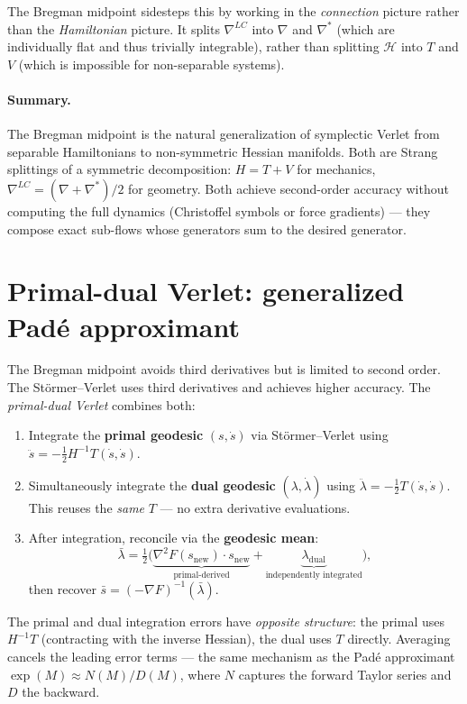 \documentclass[11pt]{article}
\begin{document}
The Bregman midpoint sidesteps this by working in the \emph{connection}
picture rather than the \emph{Hamiltonian} picture.  It splits
$\nabla^{LC}$ into $\nabla$ and $\nabla^*$ (which are individually flat
and thus trivially integrable), rather than splitting $\mathcal{H}$ into
$T$ and $V$ (which is impossible for non-separable systems).

\paragraph{Summary.}
The Bregman midpoint is the natural generalization of symplectic
Verlet from separable Hamiltonians to non-symmetric Hessian manifolds.
Both are Strang splittings of a symmetric decomposition:
$H = T + V$ for mechanics, $\nabla^{LC} = (\nabla + \nabla^*)/2$ for
geometry.  Both achieve second-order accuracy without computing the
full dynamics (Christoffel symbols or force gradients) --- they compose
exact sub-flows whose generators sum to the desired generator.

\section{Primal-dual Verlet: generalized Pad\'e approximant}
\label{sec:pd-verlet}

The Bregman midpoint avoids third derivatives but is limited to second
order.  The St\"ormer--Verlet uses third derivatives and achieves higher
accuracy.  The \emph{primal-dual Verlet} combines both:

\begin{enumerate}
  \item Integrate the \textbf{primal geodesic} $(s, \dot{s})$ via
    St\"ormer--Verlet using $\ddot{s} = -\frac{1}{2} H^{-1} T(\dot{s}, \dot{s})$.
  \item Simultaneously integrate the \textbf{dual geodesic} $(\lambda, \dot{\lambda})$
    using $\ddot{\lambda} = -\frac{1}{2} T(\dot{s}, \dot{s})$.
    This reuses the \emph{same} $T$ --- no extra derivative evaluations.
  \item After integration, reconcile via the \textbf{geodesic mean}:
    \[
      \bar{\lambda} = \tfrac{1}{2}\bigl(\underbrace{\nabla^2 F(s_{\text{new}}) \cdot s_{\text{new}}}_{\text{primal-derived}} + \underbrace{\lambda_{\text{dual}}}_{\text{independently integrated}}\bigr),
    \]
    then recover $\bar{s} = (-\nabla F)^{-1}(\bar{\lambda})$.
\end{enumerate}

The primal and dual integration errors have \emph{opposite structure}:
the primal uses $H^{-1} T$ (contracting with the inverse Hessian), the
dual uses $T$ directly.  Averaging cancels the leading error terms ---
the same mechanism as the Pad\'e approximant $\exp(M) \approx N(M)/D(M)$,
where $N$ captures the forward Taylor series and $D$ the backward.
\end{document}
